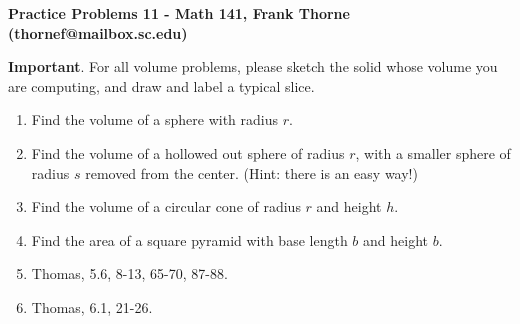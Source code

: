 \documentclass[12pt]{article}
\begin{document}
\setlength{\topmargin}{-2mm}





\begin{center}{\bf Practice Problems 11 - Math 141, Frank Thorne (thornef@mailbox.sc.edu)}

\medskip

\medskip

\end{center}
\vskip -0.1in

{\bf Important}. For all volume problems, please sketch the solid whose volume you are computing,
and draw and label a typical slice.


\begin{enumerate}

\item Find the volume of a sphere with radius $r$.
\item Find the volume of a hollowed out sphere of radius $r$, with a smaller sphere of radius $s$ removed
from the center. (Hint: there is an easy way!)
\item Find the volume of a circular cone of radius $r$ and height $h$.
\item Find the area of a square pyramid with base length $b$ and height $b$.

\item 
Thomas, 5.6, 8-13, 65-70, 87-88.
\item
Thomas, 6.1, 21-26.
\end{enumerate}
\end{document}
